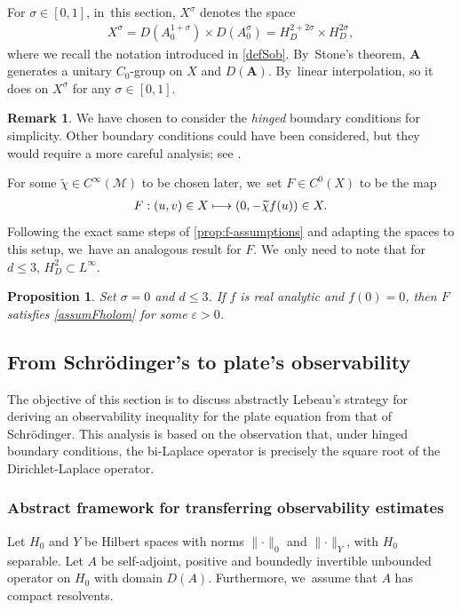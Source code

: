 \documentclass[JEP,XML,SOM,Unicode,published]{cedram}
\newcommand\mto{\mathchoice{\longmapsto}{\mapsto}{\mapsto}{\mapsto}}
\newtheorem{proposition}[theorem]{Proposition}
\theoremstyle{definition}
\newtheorem{remark}[theorem]{Remark}
\let\mc\mathcal
\let\veps\varepsilon
\newcommand{\M}{\mc{M}}
\newcommand{\bA}{\boldsymbol{A}}
\providecommand{\norm}[1]{\lVert#1\rVert}
\begin{document}
For $\sigma\in [0, 1]$, in~this section, $X^\sigma$ denotes the space
\begin{align*}
X^\sigma=D(A_0^{1+\sigma})\times D(A_0^{\sigma})=H_D^{2+2\sigma}\times H_D^{2\sigma},
\end{align*}
where we recall the notation introduced in \eqref{defSob}. By~Stone's theorem, $\bA$ generates a unitary $C_0$-group on $X$ and $D(\bA)$. By~linear interpolation, so it does on $X^\sigma$ for any $\sigma\in [0, 1]$.

\begin{remark}
We have chosen to consider the \emph{hinged} boundary conditions for simplicity. Other boundary conditions could have been considered, but they would require a more careful analysis; see \cite{ET:15}.
\end{remark}

For some $\widetilde{\chi}\in C^{\infty}(\M)$ to be chosen later, we~set $F\in C^0(X)$ to be the map
\begin{align*}
F: (u, v)\in X\mto (0, -\widetilde{\chi}f(u))\in X.
\end{align*}
Following the exact same steps of \cref{prop:f-assumptions} and adapting the spaces to this setup, we~have an analogous result for $F$. We~only need to note that for $d\leq 3$, $H^{2}_D\subset L^{\infty}$.

\begin{proposition}\label{prop:f-assumptions-pl}
Set $\sigma=0$ and $d\leq 3$. If $f$ is real analytic and $f(0)=0$, then $F$ satisfies \cref{assumFholom} for some $\veps>0$.
\end{proposition}

\subsection{From Schrödinger's to plate's observability}
The objective of this section is to discuss abstractly Lebeau's strategy \cite{Leb92} for deriving an observability inequality for the plate equation from that of Schrödinger. This analysis is based on the observation that, under hinged boundary conditions, the bi-Laplace operator is precisely the square root of the Dirichlet-Laplace operator.

\subsubsection{Abstract framework for transferring observability estimates} Let $H_0$ and $Y$ be Hilbert spaces with norms $\norm{\cdot}_0$ and $\norm{\cdot}_Y$, with $H_0$ separable. Let $A$ be self-adjoint, positive and boundedly invertible unbounded operator on $H_0$ with domain $D(A)$. Furthermore, we~assume that $A$ has compact resolvents.
\end{document}
